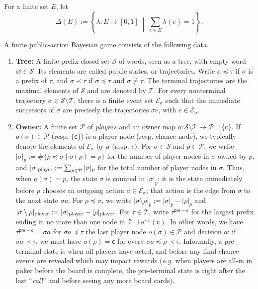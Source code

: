 \documentclass[12pt, a4paper]{article}
\begin{document}
\begin{definition}\label{def:finite-pbg}
For a finite set $E$, let
\begin{equation}\label{eq:probability-simplex}
\Delta(E):=\left\{\lambda:E\to[0,1]\;\middle|\;\sum_{e\in E}\lambda(e)=1\right\}.
\end{equation}

A finite public-action Bayesian game consists of the following data.
\begin{enumerate}[label =(\roman*)]
    \item \textbf{Tree:} A finite prefix-closed set $\mathcal S$ of words, seen as a tree, with empty word $\varnothing\in\mathcal S$.
    Its elements are called public states, or trajectories.
    Write $\sigma\preccurlyeq\tau$ if $\sigma$ is a prefix of $\tau$, and $\sigma\prec\tau$ if $\sigma\preccurlyeq\tau$ and $\sigma\neq\tau$.
    The terminal trajectories are the maximal elements of $\mathcal S$ and are denoted by $\mathcal T$.
    For every nonterminal trajectory $\sigma\in\mathcal S\setminus\mathcal T$, there is a finite event set $\mathcal E_\sigma$ such that the immediate successors of $\sigma$ are precisely the trajectories $\sigma e$, with $e\in\mathcal E_\sigma$.

    \item \textbf{Owner:} A finite set $\mathcal{P}$ of \textit{players} and an owner map $o:\mathcal S\setminus\mathcal T \to \mathcal{P}\sqcup\{\mathsf c\}$.
    If $o(\sigma)\in\mathcal P$ (resp. $\{\mathsf c\}$) is a player node (resp. chance node), we typically denote the elements of $\mathcal{E}_\sigma$ by $a$ (resp. $c$).
    For $\sigma \in \mathcal S$ and $p \in \mathcal P$, we write
    $|\sigma|_p:=\#\{\rho\preccurlyeq\sigma\mid o(\rho)=p\}$ for the number of player nodes in $\sigma$ owned by $p$, and $|\sigma|_{\textnormal{player}}:=\sum_{p\in\mathcal P}|\sigma|_p$ for the total number of player nodes in $\sigma$.
    Thus, when $o(\sigma)=p$, the state $\sigma$ is counted in $|\sigma|_p$: it is the state immediately before $p$ chooses an outgoing action $a\in\mathcal E_\sigma$; that action is the edge from $\sigma$ to the next state $\sigma a$.
    For $\rho\preccurlyeq\sigma$, we write $|\sigma\setminus\rho|_p:=|\sigma|_p-|\rho|_p$ and $|\sigma\setminus\rho|_{\textnormal{player}}:=|\sigma|_{\textnormal{player}}-|\rho|_{\textnormal{player}}$.
    For $\tau \in \mathcal{T}$, write $\tau^{\mathsf{pre-c}}$ for the largest prefix ending in no more than one node in $\mathcal{T} \sqcup o^{-1}(\mathsf{c})$.
    In other words, we have $\tau^{\mathsf{pre-c}} = \sigma a$ for $\sigma a \preccurlyeq \tau$ the last player node $o(\sigma) \in \mathcal{P}$ and decision $a$: if $\sigma a \prec \tau$, we must have $o(\rho) = \mathsf{c}$ for every $\sigma a \preccurlyeq \rho \prec \tau$.
    Informally, a pre-terminal state is when all players have acted, and before any final chance events are revealed which may impact rewards (\textit{e.g.} when players are all-in in poker before the board is complete, the pre-terminal state is right after the last ``\textit{call}'' and before seeing any more board cards).


\end{enumerate}
\end{definition}
\end{document}
